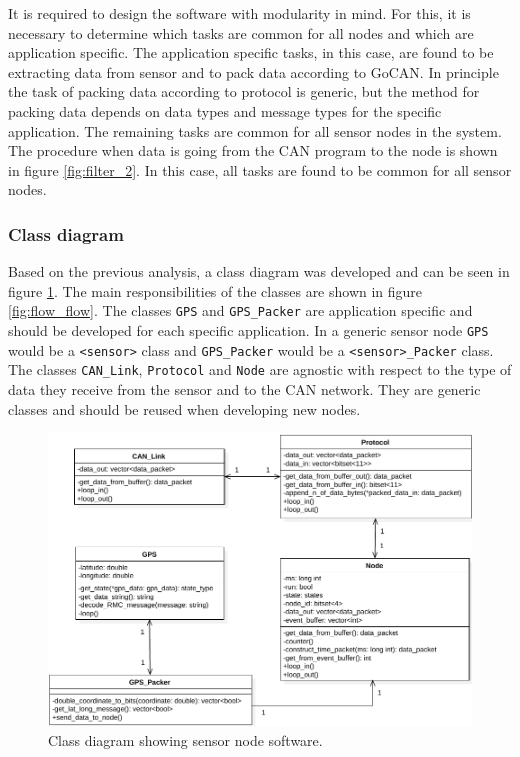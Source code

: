 It is required to design the software with modularity in mind.
For this, it is necessary to determine which tasks are common for all nodes and which are application specific.
The application specific tasks, in this case, are found to be extracting data from sensor and to pack data according to GoCAN.
In principle the task of packing data according to protocol is generic, but the method for packing data depends on data types and message types for the specific application.
The remaining tasks are common for all sensor nodes in the system. 
The procedure when data is going from the CAN program to the node is shown in figure \ref{fig:filter_2}.
In this case, all tasks are found to be common for all sensor nodes.

\subsubsection*{Class diagram}
Based on the previous analysis, a class diagram was developed and can be seen in figure \ref{fig:node_class_diagram}.
The main responsibilities of the classes are shown in figure \ref{fig:flow_flow}.
The classes \texttt{GPS} and \texttt{GPS\_Packer} are application specific and should be developed for each specific application.
In a generic sensor node \texttt{GPS} would be a \texttt{<sensor>} class and \texttt{GPS\_Packer}  would be a \texttt{<sensor>\_Packer} class. 
The classes \texttt{CAN\_Link}, \texttt{Protocol} and \texttt{Node} are agnostic with respect to the type of data they receive from the sensor and to the CAN network.
They are generic classes and should be reused when developing new nodes.

\begin{figure}[!h]
\centering
\includegraphics[width=1\textwidth]{graphics/ClassDiagram_NodeSimple}
\caption{Class diagram showing sensor node software.}
\label{fig:node_class_diagram}
\end{figure}


